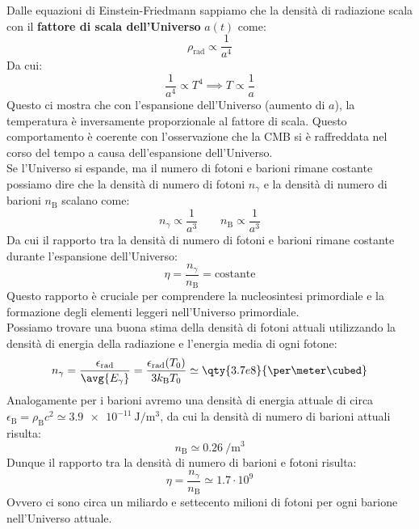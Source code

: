 Dalle equazioni di Einstein-Friedmann sappiamo che la densità di radiazione scala con il \textbf{fattore di scala dell'Universo} $a(t)$ come:
\begin{equation}
    \rho_{\text{rad}} \propto \dfrac{1}{a^4}
\end{equation}
Da cui:
\begin{equation}
    \dfrac{1}{a^4} \propto T^4 \implies T \propto \dfrac{1}{a}
\end{equation}
Questo ci mostra che con l'espansione dell'Universo (aumento di $a$), la temperatura è inversamente proporzionale al fattore di scala. Questo comportamento è coerente con l'osservazione che la CMB si è raffreddata nel corso del tempo a causa dell'espansione dell'Universo.\\
Se l'Universo si espande, ma il numero di fotoni e barioni rimane costante possiamo dire che la densità di numero di fotoni $n_{\gamma}$ e la densità di numero di barioni $n_{\text{B}}$ scalano come:
\begin{equation}
    n_{\gamma} \propto \dfrac{1}{a^3} \qquad n_{\text{B}} \propto \dfrac{1}{a^3}
\end{equation}
Da cui il rapporto tra la densità di numero di fotoni e barioni rimane costante durante l'espansione dell'Universo:
\begin{equation}
    \eta = \dfrac{n_{\gamma}}{n_{\text{B}}} = \text{costante}
\end{equation}
Questo rapporto è cruciale per comprendere la nucleosintesi primordiale e la formazione degli elementi leggeri nell'Universo primordiale.\\
Possiamo trovare una buona stima della densità di fotoni attuali utilizzando la densità di energia della radiazione e l'energia media di ogni fotone:
\begin{equation}
    n_{\gamma} = \dfrac{\epsilon_{\text{rad}}}{\avg{E_{\gamma}}} = \dfrac{\epsilon_{\text{rad}}(T_0)}{3 k_{\text{B}} T_0} \simeq \qty{3.7e8}{\per\meter\cubed}
\end{equation}
Analogamente per i barioni avremo una densità di energia attuale di circa $\epsilon_{\text{B}} = \rho_{\text{B}} c^2 \simeq \qty{3.9e-11}{\joule\per\meter\cubed}$, da cui la densità di numero di barioni attuali risulta:
\begin{equation}
    n_{\text{B}} \simeq \qty{0.26}{\per\meter\cubed}
\end{equation}
Dunque il rapporto tra la densità di numero di barioni e fotoni risulta:
\begin{equation}
    \eta = \dfrac{n_{\gamma}}{n_{\text{B}}}\simeq 1.7\cdot 10^{9}
\end{equation}
Ovvero ci sono circa un miliardo e settecento milioni di fotoni per ogni barione nell'Universo attuale.\\
